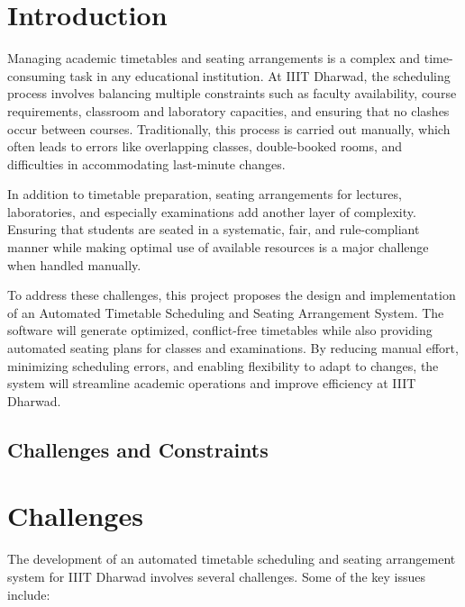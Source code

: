 \documentclass[12pt]{article}
\begin{document}
\newpage

\newpage



\section{Introduction}
Managing academic timetables and seating arrangements is a complex and time-consuming task in any educational institution. At IIIT Dharwad, the scheduling process involves balancing multiple constraints such as faculty availability, course requirements, classroom and laboratory capacities, and ensuring that no clashes occur between courses. Traditionally, this process is carried out manually, which often leads to errors like overlapping classes, double-booked rooms, and difficulties in accommodating last-minute changes.

In addition to timetable preparation, seating arrangements for lectures, laboratories, and especially examinations add another layer of complexity. Ensuring that students are seated in a systematic, fair, and rule-compliant manner while making optimal use of available resources is a major challenge when handled manually.

To address these challenges, this project proposes the design and implementation of an Automated Timetable Scheduling and Seating Arrangement System. The software will generate optimized, conflict-free timetables while also providing automated seating plans for classes and examinations. By reducing manual effort, minimizing scheduling errors, and enabling flexibility to adapt to changes, the system will streamline academic operations and improve efficiency at IIIT Dharwad.


\subsection{Challenges and Constraints}
\section{Challenges}

The development of an automated timetable scheduling and seating arrangement system 
for IIIT Dharwad involves several challenges. Some of the key issues include:
\end{document}
